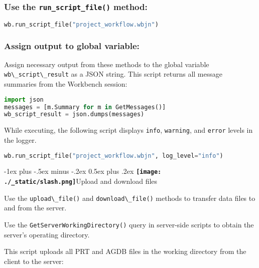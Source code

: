 \documentclass[
  9pt,
  landscape]{article}
\makeatletter
\newcommand{\passthrough}[1]{#1}
\renewcommand{\section}{\@startsection{section}{1}{0mm}%
                                {-1ex plus -.5ex minus -.2ex}%
                                {0.5ex plus .2ex}%
                                {\normalfont\Large\bfseries\texttt{[image: ./\_static/slash.png]}\hspace{0.3em}}}
\makeatother
\begin{document}
\begin{multicols}{3}
\subsubsection{\texorpdfstring{Use the \texttt{run\_script\_file()}
method:}{Use the run\_script\_file() method:}}\label{use-the-run_script_file-method}

\begin{lstlisting}[language=Python]
wb.run_script_file("project_workflow.wbjn")
\end{lstlisting}

\subsubsection{Assign output to global
variable:}\label{assign-output-to-global-variable}

Assign necessary output from these methods to the global variable
\passthrough{\lstinline!wb\_script\_result!} as a JSON string. This
script returns all message summaries from the Workbench session:

\begin{lstlisting}[language=Python]
import json
messages = [m.Summary for m in GetMessages()]
wb_script_result = json.dumps(messages)
\end{lstlisting}

While executing, the following script displays
\passthrough{\lstinline!info!}, \passthrough{\lstinline!warning!}, and
\passthrough{\lstinline!error!} levels in the logger.

\begin{lstlisting}[language=Python]
wb.run_script_file("project_workflow.wbjn", log_level="info")
\end{lstlisting}

\section{Upload and download files}\label{upload-and-download-files}

Use the \passthrough{\lstinline!upload\_file()!} and
\passthrough{\lstinline!download\_file()!} methods to transfer data
files to and from the server.

Use the \passthrough{\lstinline!GetServerWorkingDirectory()!} query in
server-side scripts to obtain the server's operating directory.

This script uploads all PRT and AGDB files in the working directory from
the client to the server:


\end{multicols}
\end{document}
